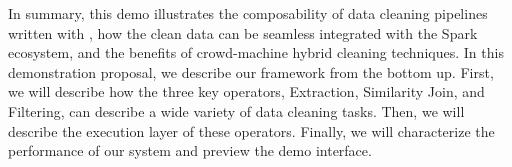 \vspace{1em}

In summary, this demo illustrates the composability of data cleaning pipelines written with \projx, how the clean data can be seamless integrated with the Spark ecosystem, and the benefits of crowd-machine hybrid cleaning techniques.
In this demonstration proposal, we describe our framework from the bottom up.
First, we will describe how the three key operators, Extraction, Similarity Join, and Filtering, can describe a wide variety of data cleaning tasks. 
Then, we will describe the execution layer of these operators.
Finally, we will characterize the performance of our system and preview the demo interface.





